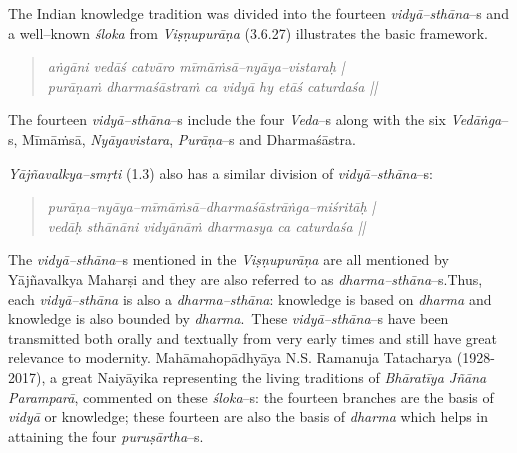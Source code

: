 The Indian knowledge tradition was divided into the fourteen \textit{vidyā–sthāna}–s and a well–known \textit{śloka} from \textit{Viṣṇupurāṇa} (3.6.27) illustrates the basic framework.

\vspace{-.3cm}

\begin{verse}
\textit{aṅgāni vedāś catvāro mīmāṁsā–nyāya–vistaraḥ | }\\\textit{purāṇaṁ dharmaśāstraṁ ca vidyā hy etāś caturdaśa ||}
\end{verse}

\vspace{-.3cm}

The fourteen \textit{vidyā–sthāna}–s include the four \textit{Veda}–s along with the six \textit{Vedāṅga}–s, Mīmāṁsā, \textit{Nyāyavistara}, \textit{Purāṇa}–s and Dharmaśāstra.


\textit{Yājñavalkya–smṛti} (1.3) also has a similar division of \textit{vidyā–sthāna}–s:

\vspace{-.3cm}

\begin{verse}
\textit{purāṇa–nyāya–mīmāṁsā–dharmaśāstrāṅga–miśritāḥ |}\\\textit{vedāḥ sthānāni vidyānāṁ dharmasya ca caturdaśa ||}
\end{verse}

\vspace{-.3cm}

The \textit{vidyā–sthāna}–s mentioned in the \textit{Viṣṇupurāṇa} are all mentioned by Yājñavalkya Maharṣi and they are also referred to as \textit{dharma–sthāna}–s.\break Thus, each \textit{vidyā–sthāna} is also a \textit{dharma–sthāna}: knowledge is based on \textit{dharma} and knowledge is also bounded by \textit{dharma}.~These \textit{vidyā–sthāna}–s have been transmitted both orally and textually from very early times and still have great relevance to modernity. Mahāmahopādhyāya N.S. Ramanuja Tatacharya (1928-2017), a great Naiyāyika representing the living traditions of \textit{Bhāratīya Jñāna Paramparā}, commented on these \textit{śloka}–s: the fourteen branches are the basis of\textit{ vidyā }or knowledge; these fourteen are also the basis of \textit{dharma }which helps in attaining the four \textit{puruṣārtha}–s.

